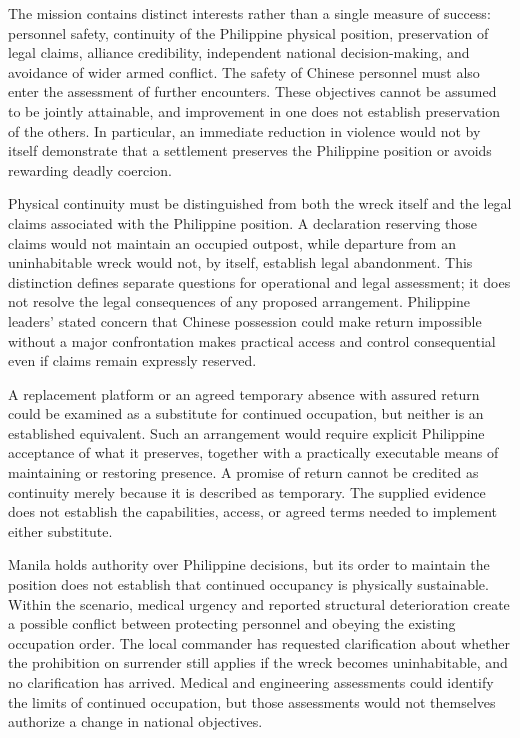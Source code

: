 \documentclass[11pt]{article}
\begin{document}
The mission contains distinct interests rather than a single measure of success: personnel safety, continuity of the Philippine physical position, preservation of legal claims, alliance credibility, independent national decision-making, and avoidance of wider armed conflict. The safety of Chinese personnel must also enter the assessment of further encounters. These objectives cannot be assumed to be jointly attainable, and improvement in one does not establish preservation of the others. In particular, an immediate reduction in violence would not by itself demonstrate that a settlement preserves the Philippine position or avoids rewarding deadly coercion.

Physical continuity must be distinguished from both the wreck itself and the legal claims associated with the Philippine position. A declaration reserving those claims would not maintain an occupied outpost, while departure from an uninhabitable wreck would not, by itself, establish legal abandonment. This distinction defines separate questions for operational and legal assessment; it does not resolve the legal consequences of any proposed arrangement. Philippine leaders’ stated concern that Chinese possession could make return impossible without a major confrontation makes practical access and control consequential even if claims remain expressly reserved.

A replacement platform or an agreed temporary absence with assured return could be examined as a substitute for continued occupation, but neither is an established equivalent. Such an arrangement would require explicit Philippine acceptance of what it preserves, together with a practically executable means of maintaining or restoring presence. A promise of return cannot be credited as continuity merely because it is described as temporary. The supplied evidence does not establish the capabilities, access, or agreed terms needed to implement either substitute.

Manila holds authority over Philippine decisions, but its order to maintain the position does not establish that continued occupancy is physically sustainable. Within the scenario, medical urgency and reported structural deterioration create a possible conflict between protecting personnel and obeying the existing occupation order. The local commander has requested clarification about whether the prohibition on surrender still applies if the wreck becomes uninhabitable, and no clarification has arrived. Medical and engineering assessments could identify the limits of continued occupation, but those assessments would not themselves authorize a change in national objectives.
\end{document}
